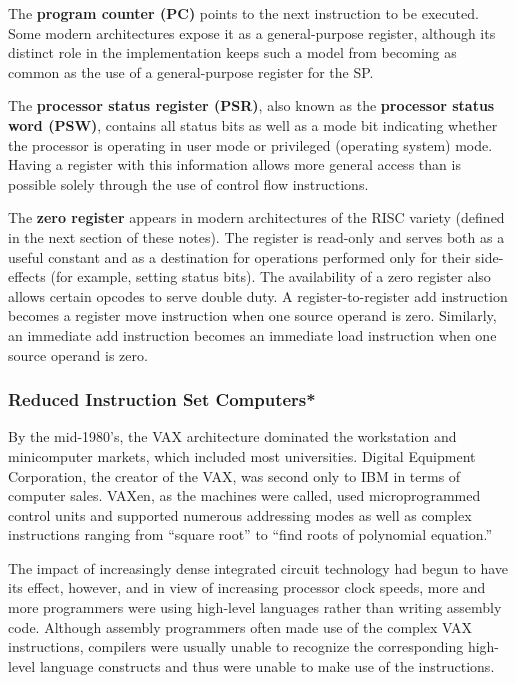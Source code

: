 The {\bf program counter (PC)} points to the next instruction to be
executed.  Some modern architectures expose it as a general-purpose
register, although its distinct role in the implementation keeps such
a model from becoming as common as the use of a general-purpose
register for the SP.

The {\bf processor status register (PSR)}, also known as the {\bf
processor status word (PSW)}, contains all status bits as well as a
mode bit indicating whether the processor is operating in user mode or
privileged (operating system) mode.  Having a register with this
information allows more general access than is possible solely through
the use of control flow instructions.

The {\bf zero register} appears in modern architectures of the RISC
variety (defined in the next section of these notes).  The register is
read-only and serves both as a useful constant and as a destination
for operations performed only for their side-effects (for example, setting
status bits).  The availability of a zero register also allows certain
opcodes to serve double duty.  A register-to-register add instruction
becomes a register move instruction when one source operand is zero.
Similarly, an immediate add instruction becomes an immediate load
instruction when one source operand is zero.\\


\subsubsection{Reduced Instruction Set Computers*}

By the mid-1980's, the VAX architecture dominated the workstation and
minicomputer markets, which included most universities.  Digital
Equipment Corporation, the creator of the VAX, was second only to IBM
in terms of computer sales.  VAXen, as the machines were called, used
microprogrammed control units and supported numerous addressing modes
as well as complex instructions ranging from ``square root'' to
``find roots of polynomial equation.''

The impact of increasingly dense integrated circuit technology had
begun to have its effect, however, and in view of increasing processor
clock speeds, more and more programmers were using high-level
languages rather than writing assembly code.  Although assembly
programmers often made use of the complex VAX instructions, compilers
were usually unable to recognize the corresponding high-level language
constructs and thus were unable to make use of the instructions.

